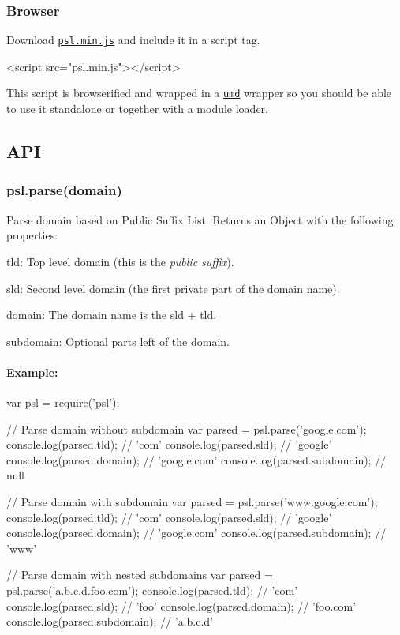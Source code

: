 \subsubsection*{Browser}

Download \href{https://raw.githubusercontent.com/lupomontero/psl/master/dist/psl.min.js}{\tt psl.\+min.\+js} and include it in a script tag.


\begin{DoxyCode}
<script src="psl.min.js"></script>
\end{DoxyCode}


This script is browserified and wrapped in a \href{https://github.com/umdjs/umd}{\tt umd} wrapper so you should be able to use it standalone or together with a module loader.

\subsection*{A\+PI}

\subsubsection*{{\ttfamily psl.\+parse(domain)}}

Parse domain based on Public Suffix List. Returns an {\ttfamily Object} with the following properties\+:


\begin{DoxyItemize}
\item {\ttfamily tld}\+: Top level domain (this is the {\itshape public suffix}).
\item {\ttfamily sld}\+: Second level domain (the first private part of the domain name).
\item {\ttfamily domain}\+: The domain name is the {\ttfamily sld} + {\ttfamily tld}.
\item {\ttfamily subdomain}\+: Optional parts left of the domain.
\end{DoxyItemize}

\paragraph*{Example\+:}


\begin{DoxyCode}
var psl = require('psl');

// Parse domain without subdomain
var parsed = psl.parse('google.com');
console.log(parsed.tld); // 'com'
console.log(parsed.sld); // 'google'
console.log(parsed.domain); // 'google.com'
console.log(parsed.subdomain); // null

// Parse domain with subdomain
var parsed = psl.parse('www.google.com');
console.log(parsed.tld); // 'com'
console.log(parsed.sld); // 'google'
console.log(parsed.domain); // 'google.com'
console.log(parsed.subdomain); // 'www'

// Parse domain with nested subdomains
var parsed = psl.parse('a.b.c.d.foo.com');
console.log(parsed.tld); // 'com'
console.log(parsed.sld); // 'foo'
console.log(parsed.domain); // 'foo.com'
console.log(parsed.subdomain); // 'a.b.c.d'
\end{DoxyCode}


